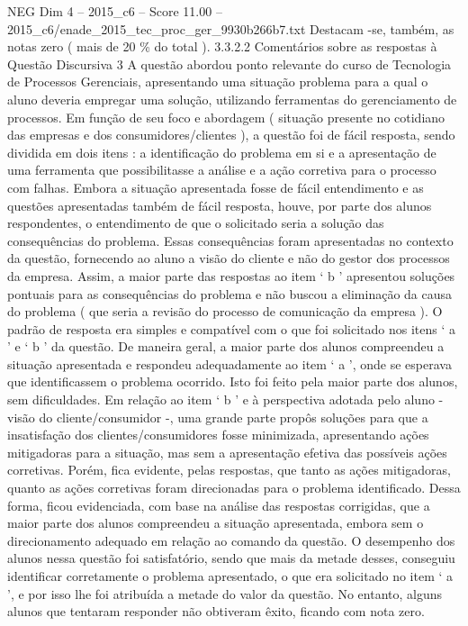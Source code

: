 \begin{textsample}{NEG Dim 4 – 2015\_c6 – Score 11.00 – 2015\_c6/enade\_2015\_tec\_proc\_ger\_9930b266b7.txt}
Destacam -se, também, as notas zero ( mais de 20 \% do total ). 3.3.2.2 Comentários sobre as respostas à Questão Discursiva 3 A questão abordou ponto relevante do curso de Tecnologia de Processos Gerenciais, apresentando uma situação problema para a qual o aluno deveria empregar uma solução, utilizando ferramentas do gerenciamento de processos.
Em função de seu foco e abordagem ( situação presente no cotidiano das empresas e dos consumidores/clientes ), a questão foi de fácil resposta, sendo dividida em dois itens : a identificação do problema em si e a apresentação de uma ferramenta que possibilitasse a análise e a ação corretiva para o processo com falhas.
Embora a situação apresentada fosse de fácil entendimento e as questões apresentadas também de fácil resposta, houve, por parte dos alunos respondentes, o entendimento de que o solicitado seria a solução das consequências do problema.
Essas consequências foram apresentadas no contexto da questão, fornecendo ao aluno a visão do cliente e não do gestor dos processos da empresa.
Assim, a maior parte das respostas ao item ‘ b ’ apresentou soluções pontuais para as consequências do problema e não buscou a eliminação da causa do problema ( que seria a revisão do processo de comunicação da empresa ).
O padrão de resposta era simples e compatível com o que foi solicitado nos itens ‘ a ’ e ‘ b ’ da questão.
De maneira geral, a maior parte dos alunos compreendeu a situação apresentada e respondeu adequadamente ao item ‘ a ’, onde se esperava que identificassem o problema ocorrido.
Isto foi feito pela maior parte dos alunos, sem dificuldades.
Em relação ao item ‘ b ’ e à perspectiva adotada pelo aluno - visão do cliente/consumidor -, uma grande parte propôs soluções para que a insatisfação dos clientes/consumidores fosse minimizada, apresentando ações mitigadoras para a situação, mas sem a apresentação efetiva das possíveis ações corretivas.
Porém, fica evidente, pelas respostas, que tanto as ações mitigadoras, quanto as ações corretivas foram direcionadas para o problema identificado.
Dessa forma, ficou evidenciada, com base na análise das respostas corrigidas, que a maior parte dos alunos compreendeu a situação apresentada, embora sem o direcionamento adequado em relação ao comando da questão.
O desempenho dos alunos nessa questão foi satisfatório, sendo que mais da metade desses, conseguiu identificar corretamente o problema apresentado, o que era solicitado no item ‘ a ’, e por isso lhe foi atribuída a metade do valor da questão.
No entanto, alguns alunos que tentaram responder não obtiveram êxito, ficando com nota zero.

\end{textsample}

